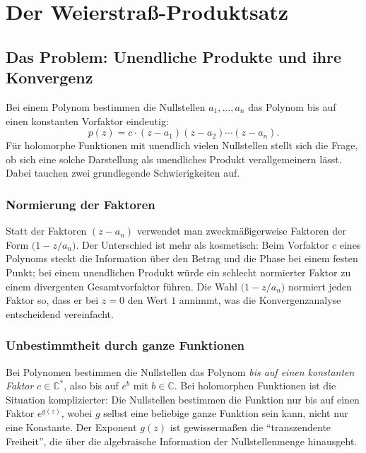 %
%
%
%
\section{Der Weierstraß-Produktsatz}

\subsection{Das Problem: Unendliche Produkte und ihre Konvergenz}

Bei einem Polynom bestimmen die Nullstellen $a_1, \ldots, a_n$ das Polynom bis
auf einen konstanten Vorfaktor eindeutig:
\[
p(z) = c \cdot (z - a_1)(z - a_2) \cdots (z - a_n).
\]
Für holomorphe Funktionen mit unendlich vielen Nullstellen stellt sich die Frage,
ob sich eine solche Darstellung als unendliches Produkt verallgemeinern lässt.
Dabei tauchen zwei grundlegende Schwierigkeiten auf.

\subsubsection{Normierung der Faktoren}
Statt der Faktoren $(z - a_n)$ verwendet man zweckmäßigerweise Faktoren der Form
$\bigl(1 - z/a_n\bigr)$.
Der Unterschied ist mehr als kosmetisch: Beim Vorfaktor $c$ eines Polynoms
steckt die Information über den Betrag und die Phase bei einem festen Punkt;
bei einem unendlichen Produkt würde ein schlecht normierter Faktor zu einem
divergenten Gesamtvorfaktor führen.
Die Wahl $\bigl(1 - z/a_n\bigr)$ normiert jeden Faktor so, dass er bei $z = 0$
den Wert $1$ annimmt, was die Konvergenzanalyse entscheidend vereinfacht.

\subsubsection{Unbestimmtheit durch ganze Funktionen}
Bei Polynomen bestimmen die Nullstellen das Polynom \emph{bis auf einen
konstanten Faktor} $c \in \mathbb{C}^*$, also bis auf $e^b$ mit $b \in \mathbb{C}$.
Bei holomorphen Funktionen ist die Situation komplizierter: Die Nullstellen
bestimmen die Funktion nur bis auf einen Faktor $e^{g(z)}$, wobei $g$ selbst
eine beliebige ganze Funktion sein kann, nicht nur eine Konstante.
Der Exponent $g(z)$ ist gewissermaßen die ``transzendente Freiheit'', die über
die algebraische Information der Nullstellenmenge hinausgeht.

